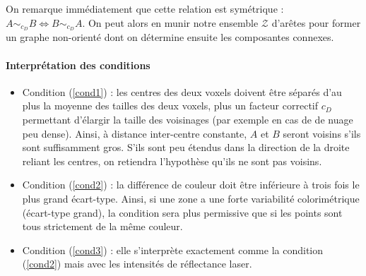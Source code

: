 \documentclass[a4paper, onecolumn, 11pt]{article}
\begin{document}
On remarque immédiatement que cette relation est symétrique : $A \sim_{c_D} B \Leftrightarrow B \sim_{c_D} A$. On peut alors en munir notre ensemble $\mathcal{Z}$ d'arêtes pour former un graphe non-orienté dont on détermine ensuite les composantes connexes.

\newpage

\paragraph*{Interprétation des conditions}

\begin{itemize}
\item Condition (\ref{cond1}) : les centres des deux voxels doivent être séparés d'au plus la moyenne des tailles des deux voxels, plus un facteur correctif $c_D$ permettant d'élargir la taille des voisinages (par exemple en cas de de nuage peu dense). Ainsi, à distance inter-centre constante, $A$ et $B$ seront voisins s'ils sont suffisamment gros. S'ils sont peu étendus dans la direction de la droite reliant les centres, on retiendra l'hypothèse qu'ils ne sont pas voisins.
\item Condition (\ref{cond2}) : la différence de couleur doit être inférieure à trois fois le plus grand écart-type. Ainsi, si une zone a une forte variabilité colorimétrique (écart-type grand), la condition sera plus permissive que si les points sont tous strictement de la même couleur.
\item Condition (\ref{cond3}) : elle s'interprète exactement comme la condition (\ref{cond2}) mais avec les intensités de réflectance laser.
\end{itemize}
\end{document}
